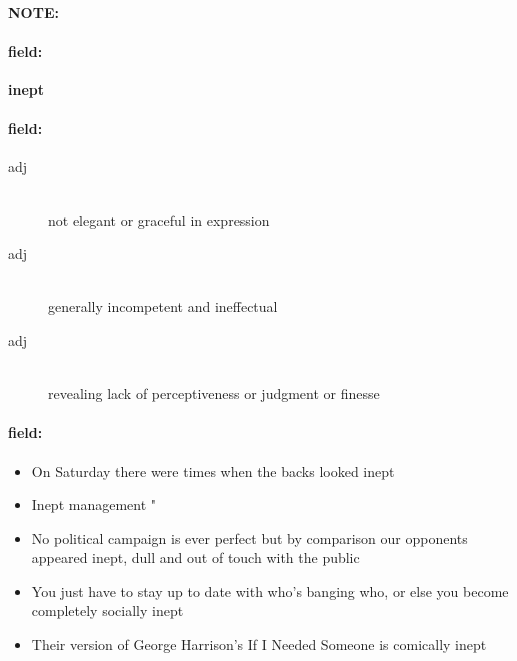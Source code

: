 \documentclass[12pt]{article}
\newenvironment{note}{\paragraph{NOTE:}}{}
\newenvironment{field}{\paragraph{field:}}{}
\begin{document}
\begin{note}
\begin{field}
\textbf{\large inept}
\end{field}


\begin{field}
\begin{description}
\item[adj] \hfill \\ 
not elegant or graceful in expression

\item[adj] \hfill \\ 
generally incompetent and ineffectual

\item[adj] \hfill \\ 
revealing lack of perceptiveness or judgment or finesse

\end{description}
\end{field}

\begin{field}
\begin{itemize}
\item On Saturday there were times when the backs looked inept
\item Inept management " 
\item No political campaign is ever perfect but by comparison our opponents appeared inept, dull and out of touch with the public
\item You just have to stay up to date with who's banging who, or else you become completely socially inept
\item Their version of George Harrison's If I Needed Someone is comically inept
\end{itemize}
\end{field}
\end{note}
\end{document}

